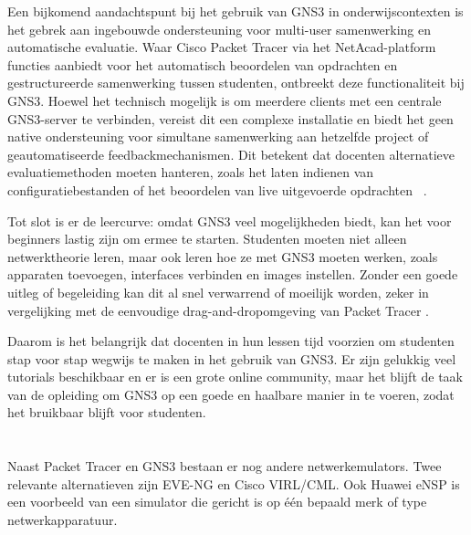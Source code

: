 \vspace{0.3cm}

Een bijkomend aandachtspunt bij het gebruik van GNS3 in onderwijscontexten is het gebrek aan ingebouwde ondersteuning voor multi-user samenwerking en automatische evaluatie. Waar Cisco Packet Tracer via het NetAcad-platform functies aanbiedt voor het automatisch beoordelen van opdrachten en gestructureerde samenwerking tussen studenten, ontbreekt deze functionaliteit bij GNS3. Hoewel het technisch mogelijk is om meerdere clients met een centrale GNS3-server te verbinden, vereist dit een complexe installatie en biedt het geen native ondersteuning voor simultane samenwerking aan hetzelfde project of geautomatiseerde feedbackmechanismen. Dit betekent dat docenten alternatieve evaluatiemethoden moeten hanteren, zoals het laten indienen van configuratiebestanden of het beoordelen van live uitgevoerde opdrachten ~\autocite{gns3_multiuser}.

\vspace{0.3cm}

Tot slot is er de leercurve: omdat GNS3 veel mogelijkheden biedt, kan het voor beginners lastig zijn om ermee te starten. Studenten moeten niet alleen netwerktheorie leren, maar ook leren hoe ze met GNS3 moeten werken, zoals apparaten toevoegen, interfaces verbinden en images instellen. Zonder een goede uitleg of begeleiding kan dit al snel verwarrend of moeilijk worden, zeker in vergelijking met de eenvoudige drag-and-dropomgeving van Packet Tracer \autocite{Amrizal2022}.

\vspace{0.3cm}

Daarom is het belangrijk dat docenten in hun lessen tijd voorzien om studenten stap voor stap wegwijs te maken in het gebruik van GNS3. Er zijn gelukkig veel tutorials beschikbaar en er is een grote online community, maar het blijft de taak van de opleiding om GNS3 op een goede en haalbare manier in te voeren, zodat het bruikbaar blijft voor studenten.


\section{}
\label{sec:Alternatieve tools: EVE-NG, Cisco VIRL en andere}

Naast Packet Tracer en GNS3 bestaan er nog andere netwerkemulators. Twee relevante alternatieven zijn EVE-NG en Cisco VIRL/CML. Ook Huawei eNSP is een voorbeeld van een simulator die gericht is op één bepaald merk of type netwerkapparatuur.

